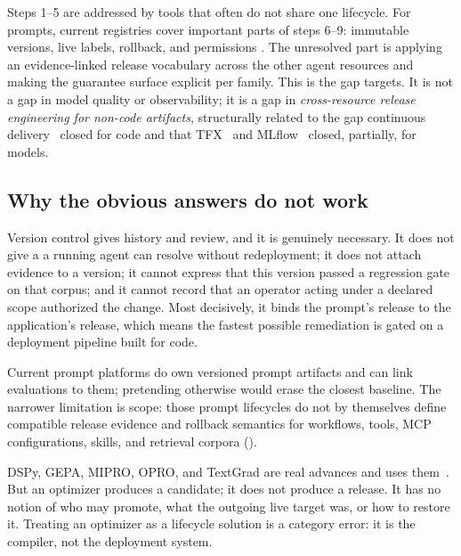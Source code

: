 Steps 1--5 are addressed by tools that often do not share one lifecycle. For
prompts, current registries cover important parts of steps 6--9: immutable versions,
live labels, rollback, and permissions
\cite{mlflowpromptregistry,langsmithprompts,langfuseprompts}. The unresolved part is
applying an evidence-linked release vocabulary across the other agent resources and
making the guarantee surface explicit per family. This is the gap \sys targets. It
is not a gap in model quality or observability; it is a gap in \emph{cross-resource
release engineering for non-code artifacts}, structurally related to the gap continuous
delivery~\cite{humble2010cd} closed for code and that TFX~\cite{baylor2017tfx} and
MLflow~\cite{zaharia2018mlflow} closed, partially, for models.

\subsection{Why the obvious answers do not work}

 Version control gives history and review, and
it is genuinely necessary. It does not give a \livetarget{} a running agent can
resolve without redeployment; it does not attach evidence to a version; it cannot
express that this version passed a regression gate on that corpus; and it cannot
record that an operator acting under a declared scope authorized the change. Most
decisively, it binds the prompt's release to the application's release, which
means the fastest possible remediation is gated on a deployment pipeline built for
code.

 Current prompt platforms
do own versioned prompt artifacts and can link evaluations to them; pretending
otherwise would erase the closest baseline. The narrower limitation is scope:
those prompt lifecycles do not by themselves define compatible release evidence and
rollback semantics for workflows, tools, MCP configurations, skills, and retrieval
corpora ().

 DSPy, GEPA, MIPRO, OPRO, and TextGrad are real
advances and \sys uses them~\cite{khattab2024dspy,agrawal2025gepa,
opsahlong2024mipro,yang2024opro,yuksekgonul2024textgrad}. But an optimizer
produces a candidate; it does not produce a release. It has no notion of who may
promote, what the outgoing live target was, or how to restore it. Treating an
optimizer as a lifecycle solution is a category error: it is the compiler, not the
deployment system.

